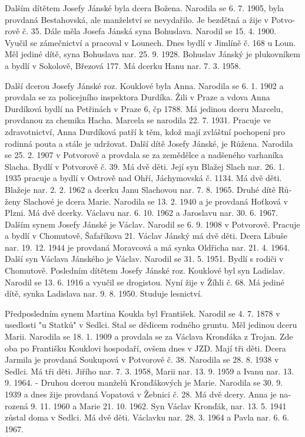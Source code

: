 \documentclass[../dejiny-rodu-prusiku.tex]{subfiles}
\begin{document}
Dalším dítětem Josefy Jánské byla dcera Božena. Narodila se 6. 7. 1905, byla provdaná Bestahovská, ale manželství se nevydařilo. Je bezdětná a žije v Potvo­rově č. 35. Dále měla Josefa Jánská syna Bohuslava. Narodil se 15. 4. 1900. Vyučil se zámečnictví a pracoval v Lounech. Dnes bydlí v Jimlíně č. 168 u Loun. Měl jediné dítě, syna Bohuslava nar. 25. 9. 1928. Bohuslav Jánský je plukovníkem a bydlí v Sokolově, Březová 177. Má dcerku Hanu nar. 7. 3. 1958.

Další dcerou Josefy Jánské roz. Kouklové byla Anna. Narodila se 6. 1. 1902 a provdala se za policejního inspektora Durdíka. Žili v Praze a vdova Anna Durdíková bydlí na Petřinách v Praze 6, čp 1788. Má jedinou dce­ru Marcelu, provdanou za chemika Hacha. Marcela se narodila 22. 7. 1931. Pracuje ve zdravotnictví, Anna Durdíková patří k těm, kdož mají zvláštní pochopení pro rodinná pouta a stále je udržovat. Další dítě Josefy Jánské, je Růžena. Narodila se 25. 2. 1907 v Potvorově a provdala se za zemědělce a nadšeného varhaníka Slacha. Bydlí v Potvorově č. 39. Má dvě děti. Její syn Blažej Slach nar. 26. 1. 1935 pracuje a bydlí v Ostrově nad Ohří,
Jáchymovská č. 1134. Má dvě děti. Blažeje nar. 2. 2. 1962 a dcerku Janu Slachovou nar. 7. 8. 1965. Druhé dítě Rů­ženy Slachové je dcera Marie. Narodila se 13. 2. 1940 a je provdaná Hoťková v Plzni. Má dvě dcerky. Václavu nar. 6. 10. 1962 a Jaroslavu nar. 30. 6. 1967. Dalším synem Josefy Jánské je Václav. Narodil se 6. 9. 1908 v Potvorově. Pracuje a bydlí v Chomutově, Šafaříkova 21. Václav Jánský má dvě děti. Dcera Libuše nar. 19. 12. 1944 je provdaná Moravcová a má synka Oldřicha  nar. 21. 4. 1964. Další syn Václava Jánského je Václav. Narodil se 31. 5. 1951. Bydlí s rodiči v Chomutově. Posledním dítětem Josefy Jánské roz. Kouklové byl syn Ladislav. Narodil se 13. 6. 1916 a vyučil se drogistou. Nyní žije v Žíhli č. 68. Má jediné dítě, synka Ladisla­va nar. 9. 8. 1950. Studuje lesnictví.

Předposledním synem Martina Koukla byl František. Narodil se 4. 7. 1878 v usedlosti "u Statků" v Sedlci. Stal se dědicem rodného gruntu. Měl jedinou dceru Marii. Narodila se 18. 1. 1909 a provdala se za Václava Kronďáka z Trojan. Zde oba po Františku Kouklovi hospodaří, ovšem dnes v JZD. Mají tři děti. Dcera Jarmila je provdaná Sou­kupová v Potvorově č. 38. Narodila se 28. 8. 1938 v Sedlci. Má tři děti. Jiřího nar. 7. 3. 1958, Marii nar. 13. 9. 1959 a Ivanu nar. 13. 9. 1964. - Druhou dcerou manželů Kronďákových je Marie. Narodila se 30. 9. 1939 a dnes žije provda­ná Vopatová v Žebnici č. 28. Má dvě dcery. Anna je na­rozená 9. 11. 1960 a Marie 21. 10. 1962. Syn Václav Kronďák, nar. 13. 5. 1941 zůstal doma v Sedlci. Má dvě děti. Václavku nar. 28. 3. 1964 a Pavla nar. 6. 6. 1967.
\end{document}
